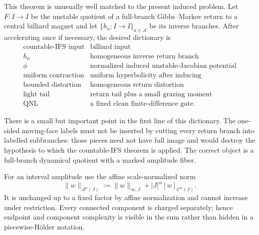 \documentclass[11pt]{article}
\begin{document}
This theorem is unusually well matched to the present induced problem.  Let
$F:I\to I$ be the unstable quotient of a full-branch Gibbs--Markov return to
a central billiard magnet and let $\{h_a:I\to I\}_{a\in\mathcal A}$ be its
inverse branches.  After accelerating once if necessary, the desired
dictionary is
\begin{equation}
\label{eq:lps-dictionary}
 \begin{array}{c|c}
 \text{countable-IFS input}&\text{billiard input}\\ \hline
 h_a&\text{homogeneous inverse return branch}\\
 \phi&\text{normalized induced unstable-Jacobian potential}\\
 \text{uniform contraction}&\text{uniform hyperbolicity after inducing}\\
 \text{bounded distortion}&\text{homogeneous return distortion}\\
 \text{light tail}&\text{return tail plus a small grazing moment}\\
 \text{QNL}&\text{a fixed clean finite-difference gate}.
 \end{array}
\end{equation}

There is a small but important point in the first line of this dictionary.
The one-sided moving-face labels must not be inserted by cutting every return
branch into labelled subbranches: those pieces need not have full image and
would destroy the hypothesis to which the countable-IFS theorem is applied.
The correct object is a full-branch dynamical quotient with a marked amplitude
fiber.

For an interval amplitude use the affine scale-normalized norm
\begin{equation}
\label{eq:scaled-amplitude-norm}
 \|w\|_{\mathcal A^\alpha(J)}
 :=\|w\|_{\infty,J}+|J|^\alpha[w]_{C^\alpha(J)}.
\end{equation}
It is unchanged up to a fixed factor by affine normalization and cannot
increase under restriction.  Every connected component is charged
separately; hence endpoint and component complexity is visible in the sum
rather than hidden in a piecewise-H\"older notation.
\end{document}
